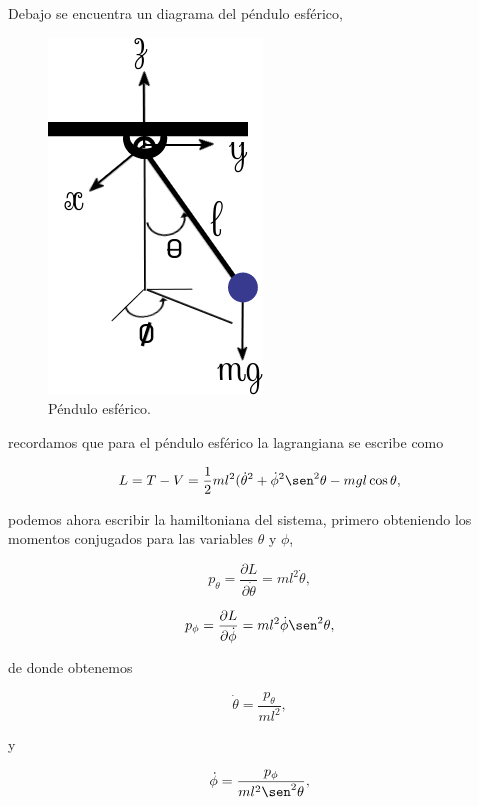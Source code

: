 \documentclass[a4paper,10pt]{article}
\numberwithin{equation}{section}
\begin{document}
Debajo se encuentra un diagrama del péndulo esférico,

\begin{figure}[H]
 \center 
 \includegraphics[scale=0.6]{problema5fig1}
 \caption{Péndulo esférico.}
 \label{fig:problema5fig1}
\end{figure}

recordamos que para el péndulo esférico la lagrangiana se escribe como 

\begin{equation}
 L = T - V = \frac{1}{2}ml^2(\dot{\theta}^2 + \dot{\phi}^2\sen^2{\theta} 
 - mgl\cos{\theta},
\end{equation}

podemos ahora escribir la hamiltoniana del sistema, primero obteniendo los momentos 
conjugados para las variables $\theta$ y $\phi$, 

\begin{equation}
 p_\theta = \frac{\partial L}{\partial \dot{\theta}} = ml^2\dot{\theta},
\end{equation}

\begin{equation}
 p_\phi = \frac{\partial L}{\partial \dot{\phi}} = ml^2\dot{\phi}\sen^2{\theta},
\end{equation}

de donde obtenemos 

\begin{equation}
 \dot{\theta} = \frac{p_\theta}{ml^2},
\end{equation}

y

\begin{equation}
 \dot{\phi} = \frac{p_\phi}{ml^2\sen^2{\theta}},
\end{equation}
\end{document}
